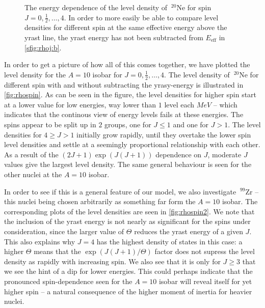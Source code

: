 \begin{figure}
\begin{center}
\begin{tabular}{cc}
\end{tabular}
\caption{\label{fig:rhospin} The energy dependence of the level density of $~^{20}\mathrm{Ne}$ for spin $J=0,\tfrac{1}{2},\dots, 4$. In order to more easily be able to compare level densities for different spin at the same effective energy above the yrast line, the yrast energy has not been subtracted from $E_\text{eff}$ in \ref{sfig:rhoj:b}.}
\end{center}
\end{figure}


In order to get a picture of how all of this comes together, we have plotted the level density for the $A=10$ isobar for $J=0,\tfrac{1}{2},\dots, 4$. The level density of $~^{20}\mathrm{Ne}$ for different spin with and without subtracting the yrasy-energy is illustrated in \autoref{fig:rhospin}. 
As can be seen in the figure, the level densities for higher spin start at a lower value for low energies, way lower than $1$ level each $\unit{MeV}$ -- which indicates that the continous view of energy levels fails at these energies. 
The spins appear to be split up in $2$ groups, one for $J \le 1$ and one for $J>1$.
The level densities for $4 \ge J> 1$ initially grow rapidly, until they overtake the lower spin level densities and settle at a seemingly proportional relationship with each other. As a result of the $(2J+1)\exp{(J(J+1))}$ dependence on $J$, moderate $J$ values give the largest level density.
The same general behaviour is seen for the other nuclei at the $A=10$ isobar.

In order to see if this is a general feature of our model, we also investigate $~^{99}\mathrm{Zr}$ -- this nuclei being chosen arbitrarily as something far form the $A=10$ isobar. The corresponding plots of the level densities are seen in \autoref{fig:rhospin2}. We note that the inclusion of the yrast energy is not nearly as significant for the spins under consideration, since the larger value of $\Theta$ reduces the yrast energy of a given $J$. This also explains why $J=4$ has the highest density of states in this case: a higher $\Theta$ means that the $\exp{(J(J+1)/\Theta)}$ factor does not supress the level density as rapidly with increasing spin. 
We also see that it is only for $J\ge 3$ that we see the hint of a dip for lower energies. This could perhaps indicate that the pronounced spin-dependence seen for the $A=10$ isobar will reveal itself for yet higher spin -- a natural consequence of the higher moment of inertia for heavier nuclei.

